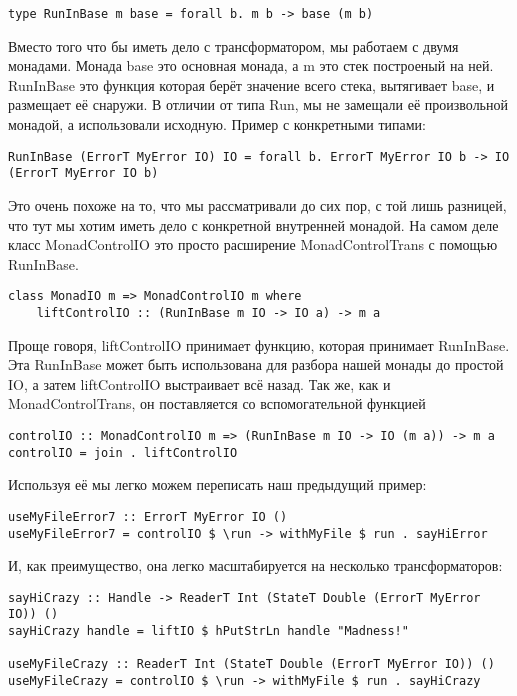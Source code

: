 \begin{lstlisting}
type RunInBase m base = forall b. m b -> base (m b)
\end{lstlisting}

Вместо того что бы иметь дело с трансформатором, мы работаем с двумя монадами.
Монада base это основная монада, а m это стек построеный на ней. RunInBase это
функция которая берёт значение всего стека, вытягивает base, и размещает её
снаружи. В отличии от типа Run, мы не замещали её произвольной монадой, а
использовали исходную. Пример с конкретными типами:

\begin{lstlisting}
RunInBase (ErrorT MyError IO) IO = forall b. ErrorT MyError IO b -> IO (ErrorT MyError IO b)
\end{lstlisting}

Это очень похоже на то, что мы рассматривали до сих пор, с той лишь разницей,
что тут мы хотим иметь дело с конкретной внутренней монадой. На самом деле
класс MonadControlIO это просто расширение MonadControlTrans с помощью
RunInBase.

\begin{lstlisting}
class MonadIO m => MonadControlIO m where
    liftControlIO :: (RunInBase m IO -> IO a) -> m a
\end{lstlisting}

Проще говоря, liftControlIO принимает функцию, которая принимает RunInBase. Эта
RunInBase может быть использована для разбора нашей монады до простой IO, а
затем liftControlIO выстраивает всё назад. Так же, как и MonadControlTrans, он
поставляется со вспомогательной функцией

\begin{lstlisting}
controlIO :: MonadControlIO m => (RunInBase m IO -> IO (m a)) -> m a
controlIO = join . liftControlIO
\end{lstlisting}

Используя её мы легко можем переписать наш предыдущий пример:

\begin{lstlisting}
useMyFileError7 :: ErrorT MyError IO ()
useMyFileError7 = controlIO $ \run -> withMyFile $ run . sayHiError
\end{lstlisting}

И, как преимущество, она легко масштабируется на несколько трансформаторов:

\begin{lstlisting}
sayHiCrazy :: Handle -> ReaderT Int (StateT Double (ErrorT MyError IO)) ()
sayHiCrazy handle = liftIO $ hPutStrLn handle "Madness!"

useMyFileCrazy :: ReaderT Int (StateT Double (ErrorT MyError IO)) ()
useMyFileCrazy = controlIO $ \run -> withMyFile $ run . sayHiCrazy
\end{lstlisting}

